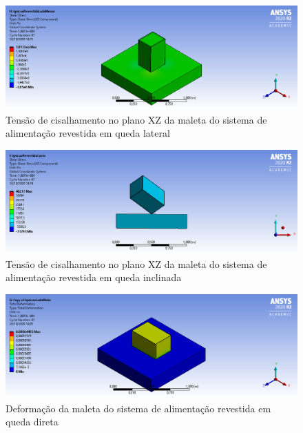 \begin{apendicesenv}
\begin{figure}[htb]
    \centering
    \includegraphics[width=1.0\textwidth, angle=0]{figuras/estrutura_simulacaoImpacto/ignicaoRevestidaCisalhamentoXZMenor.png}
    \caption{Tensão de cisalhamento no plano XZ da maleta do sistema de alimentação revestida em queda lateral}
    \label{fig:simulacaoImpacto_14}
\end{figure}

\begin{figure}[htb]
    \centering
    \includegraphics[width=1.0\textwidth, angle=0]{figuras/estrutura_simulacaoImpacto/ignicaoRevestidaCisalhamentoXZCanto.png}
    \caption{Tensão de cisalhamento no plano XZ da maleta do sistema de alimentação revestida em queda inclinada}
    \label{fig:simulacaoImpacto_15}
\end{figure}

\begin{figure}[htb]
    \centering
    \includegraphics[width=1.0\textwidth, angle=0]{figuras/estrutura_simulacaoImpacto/ignicaoRevestidaDeformacaoMaior.png}
    \caption{Deformação da maleta do sistema de alimentação revestida em queda direta}
    \label{fig:simulacaoImpacto_16}
\end{figure}


\end{apendicesenv}
